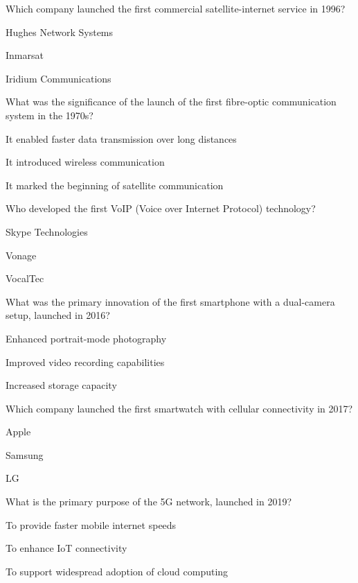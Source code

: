 \begin{enhancedmcq}{Which company launched the first commercial satellite-internet service in 1996?}
\item Hughes Network Systems
\item Inmarsat
\item Iridium Communications

\end{enhancedmcq}
\begin{enhancedmcq}{What was the significance of the launch of the first fibre-optic communication system in the 1970s?}
\item It enabled faster data transmission over long distances
\item It introduced wireless communication
\item It marked the beginning of satellite communication

\end{enhancedmcq}
\begin{enhancedmcq}{Who developed the first VoIP (Voice over Internet Protocol) technology?}
\item Skype Technologies
\item Vonage
\item VocalTec

\end{enhancedmcq}
\begin{enhancedmcq}{What was the primary innovation of the first smartphone with a dual-camera setup, launched in 2016?}
\item Enhanced portrait-mode photography
\item Improved video recording capabilities
\item Increased storage capacity

\end{enhancedmcq}
\begin{enhancedmcq}{Which company launched the first smartwatch with cellular connectivity in 2017?}
\item Apple
\item Samsung
\item LG

\end{enhancedmcq}
\begin{enhancedmcq}{What is the primary purpose of the 5G network, launched in 2019?}
\item To provide faster mobile internet speeds
\item To enhance IoT connectivity
\item To support widespread adoption of cloud computing

\end{enhancedmcq}
